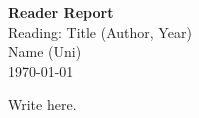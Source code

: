 \documentclass[12pt]{article}
\begin{document}
\large \textbf{Reader Report} \\
Reading: Title (Author, Year) \\
Name (Uni) \\
\today

\vspace{0.1in}

\normalsize

Write here.
\end{document}
